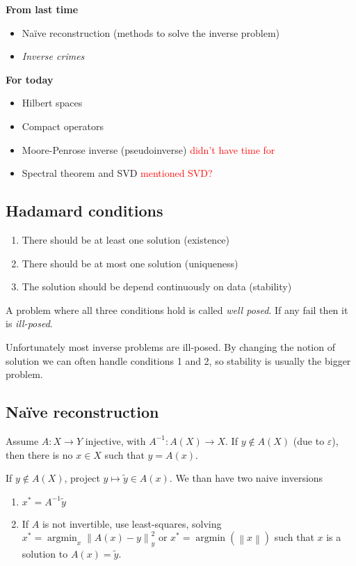 \documentclass[12pt]{article}
\theoremstyle{definition}
\newcommand{\eps}{\varepsilon}    %
\DeclareMathOperator{\argmin}{argmin}
\newcommand\norm[1]{\left\lVert#1\right\rVert}
\begin{document}
\textbf{From last time}
\begin{itemize}
    \item Naïve reconstruction (methods to solve the inverse problem)
    \item \textit{Inverse crimes}
\end{itemize}

\textbf{For today}
\begin{itemize}
    \item Hilbert spaces
    \item Compact operators
    \item Moore-Penrose inverse (pseudoinverse) \textcolor{red}{didn't have time for}
    \item Spectral theorem and SVD \textcolor{red}{mentioned SVD?}
\end{itemize}

\subsection{Hadamard conditions}
\begin{enumerate}[label=H\arabic*]
    \item There should be at least one solution (existence)
    \item There should be at most one solution (uniqueness)
    \item The solution should be depend continuously on data (stability)
\end{enumerate}
A problem where all three conditions hold is called \textit{well posed}. If any fail then it is \textit{ill-posed}.

Unfortunately most inverse problems are ill-posed. By changing the notion of solution we can often handle conditions 1 and 2, so stability is usually the bigger problem.

\subsection{Naïve reconstruction}
Assume $A:X\to Y$ injective, with  $A^{-1}:A(X)\to X$. If $y\notin A(X)$ (due to $\eps$), then there is no $x\in X$ such that $y=A(x)$. 

If $y\notin A(X)$, project $y\mapsto \tilde{y}\in A(x)$. We than have two naive inversions
\begin{enumerate}
    \item $x^*=A^{-1}\tilde{y}$
    \item If $A$ is not invertible, use least-squares, solving $x^* = \argmin_x \norm{A(x)-y}_y^2$ or $x^*= \argmin(\norm{x})$ such that $x$ is a solution to $A(x)=\tilde{y}$.
\end{enumerate}
\end{document}
